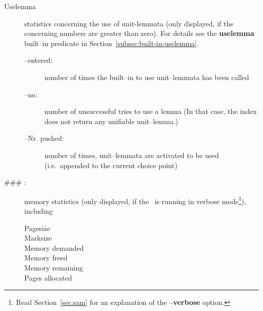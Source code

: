 \begin{description}
\item[Uselemma]
     statistics concerning the use of unit-lemmata (only displayed, if
     the concerning numbers are greater than zero). For
     details see the {\bf uselemma} built--in predicate in
     Section~\ref{subsec:built-in-uselemma}.  
     \begin{description}
     \item [--entered:]
           number of times the built--in to use unit--lemmata has been
           called 
     \item [--no:]
           number of unsuccessful tries to use a lemma (In that case,
           the index does not return any unifiable unit--lemma.)
     \item [--Nr. pushed:]
           number of times, unit--lemmata are activated to be used
           (i.e.\ appended to the current choice point)
     \end{description}

\item[\#\#\# :]
     memory statistics (only displayed, if the
     \SAM\ is running in verbose mode\footnote{Read
     Section~\ref{sec:sam} for an explanation of the {\bf --verbose}
     option.}), including
     \begin{description}
     \item [Pagesize]
     \item [Marksize]
     \item [Memory demanded]
     \item [Memory freed]
     \item [Memory remaining]
     \item [Pages allocated]
     \end{description}
     
\end{description}


